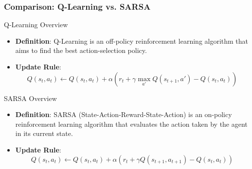 \documentclass[aspectratio=169]{beamer}
\begin{document}
\begin{frame}[fragile]
    \frametitle{Comparison: Q-Learning vs. SARSA}
    \begin{block}{Q-Learning Overview}
        \begin{itemize}
            \item \textbf{Definition}: Q-Learning is an off-policy reinforcement learning algorithm that aims to find the best action-selection policy.
            \item \textbf{Update Rule}:
            \begin{equation}
                Q(s_t, a_t) \leftarrow Q(s_t, a_t) + \alpha \left( r_t + \gamma \max_{a'} Q(s_{t+1}, a') - Q(s_t, a_t) \right)
            \end{equation}
        \end{itemize}
    \end{block}
    
    \begin{block}{SARSA Overview}
        \begin{itemize}
            \item \textbf{Definition}: SARSA (State-Action-Reward-State-Action) is an on-policy reinforcement learning algorithm that evaluates the action taken by the agent in its current state.
            \item \textbf{Update Rule}:
            \begin{equation}
                Q(s_t, a_t) \leftarrow Q(s_t, a_t) + \alpha \left( r_t + \gamma Q(s_{t+1}, a_{t+1}) - Q(s_t, a_t) \right)
            \end{equation}
        \end{itemize}
    \end{block}
\end{frame}
\end{document}
